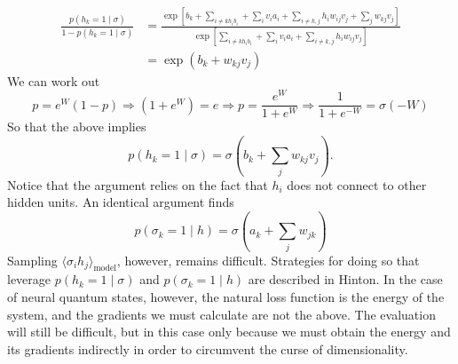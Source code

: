 \documentclass{report}
\begin{document}
\begin{align*}
	\frac{p(h_k=1\mid \sigma)}{1-p(h_k=1\mid \sigma)}
		&= \frac{
			\exp\left[b_k + \sum_{i\neq k h_i b_i} + \sum_i v_i a_i + \sum_{i\neq k, j}h_i w_{ij} v_j
				+ \sum_j w_{kj} v_j\right]
		}{
			\exp\left[\sum_{i\neq k h_i b_i} + \sum_i v_i a_i + \sum_{i\neq k, j}h_i w_{ij} v_j\right]
		}
		\\
		&=\exp\left(b_k + w_{kj} v_j\right)
\end{align*}
We can work out
\begin{equation*}
	p = e^W (1-p) \Longrightarrow (1+e^W) = e \Longrightarrow 
	p = \frac{e^W}{1 + e^W } \Longrightarrow \frac{1}{1+e^{-W}} = \sigma(-W)
\end{equation*}
So that the above implies
\begin{equation*}
	p(h_k = 1\mid \sigma) = \sigma(b_k + \sum_{j} w_{kj}v_j).
\end{equation*}
Notice that the argument relies on the fact that $ h_i $ does not connect 
to other hidden units. An identical argument finds 
\begin{equation*}
	p(\sigma_k = 1 \mid h) = \sigma(a_k + \sum_j w_{jk} )
\end{equation*}
Sampling $ \langle \sigma_i h_j\rangle_{\text{model}} $, however, remains
difficult. Strategies for doing so that leverage $ p(h_k=1\mid \sigma) $ and 
$ p(\sigma_k = 1\mid h) $ are described in Hinton. In the case of neural quantum 
states, however, the natural loss function is the energy of the system, and 
the gradients we must calculate are not the above. The evaluation will still 
be difficult, but in this case only because we must obtain the energy and its 
gradients indirectly in order to circumvent the curse of dimensionality. 
\end{document}
